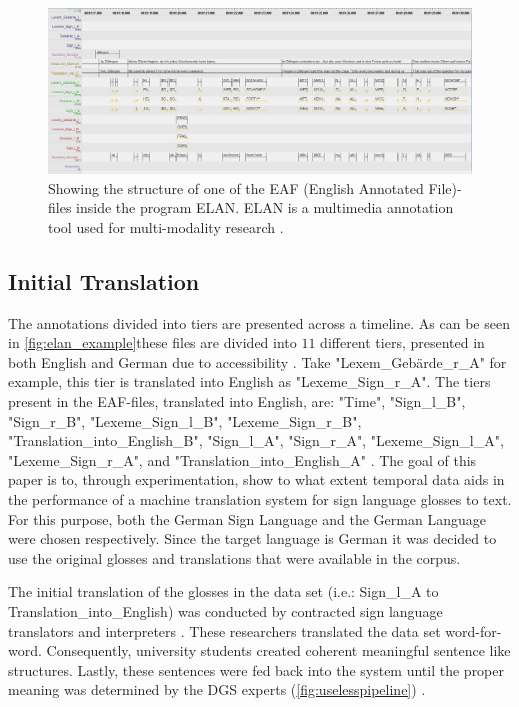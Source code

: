 \begin{figure}[h]
\caption{Showing the structure of one of the EAF (English Annotated File)-files \cite{elan_example} inside the program ELAN. ELAN is a multimedia annotation tool used for multi-modality research \cite{sloetjes2017elan}. }
 \centering 
 \includegraphics[width=14cm]{Bachelor CSAI thesis template/images/ELAN_example.jpg}
 
 \label{fig:elan_example}
\end{figure}

\subsection{Initial Translation}

The annotations divided into tiers are presented across a timeline. As can be seen in \autoref{fig:elan_example}these files are divided into $11$ different tiers, presented in both English and German due to accessibility \cite{konradoffentliches}. Take "Lexem\_Gebärde\_r\_A" for example, this tier is translated into English as "Lexeme\_Sign\_r\_A". The tiers present in the EAF-files, translated into English, are: "Time", "Sign\_l\_B", "Sign\_r\_B", "Lexeme\_Sign\_l\_B", "Lexeme\_Sign\_r\_B", 
"Translation\_into\_English\_B", "Sign\_l\_A", "Sign\_r\_A", "Lexeme\_Sign\_l\_A", "Lexeme\_Sign\_r\_A", and "Translation\_into\_English\_A" \cite{sloetjes2017elan}. The goal of this paper is to, through experimentation, show to what extent temporal data aids in the performance of a machine translation system for sign language glosses to text. For this purpose, both the German Sign Language and the German Language were chosen respectively. Since the target language is German it was decided to use the original glosses and translations that were available in the corpus.

The initial translation of the glosses in the data set (i.e.: Sign\_l\_A to Translation\_into\_English) was conducted by contracted sign language translators and interpreters \cite{konradoffentliches}. These researchers translated the data set word-for-word. Consequently, university students created coherent meaningful sentence like structures. Lastly, these sentences were fed back into the system until the proper meaning was determined by the DGS experts (\autoref{fig:uselesspipeline}) \cite{konradoffentliches}.

